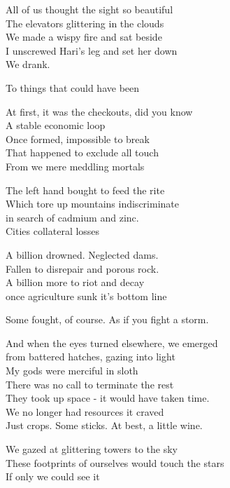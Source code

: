 All of us thought the sight so beautiful\\
The elevators glittering in the clouds\\
We made a wispy fire and sat beside\\
I unscrewed Hari’s leg and set her down\\
We drank.

To things that could have been

At first, it was the checkouts, did you know\\
A stable economic loop\\
Once formed, impossible to break\\
That happened to exclude all touch\\
From we mere meddling mortals

The left hand bought to feed the rite\\
Which tore up mountains indiscriminate  \\
in search of cadmium and zinc.\\
Cities collateral losses

A billion drowned. Neglected dams.\\
Fallen to disrepair and porous rock.\\
A billion more to riot and decay\\
once agriculture sunk it’s bottom line

Some fought, of course. As if you fight a storm.

And when the eyes turned elsewhere, we emerged\\
from battered hatches, gazing into light\\
My gods were merciful in sloth\\
There was no call to terminate the rest\\
They took up space - it would have taken time.\\
We no longer had resources it craved\\
Just crops. Some sticks. At best, a little wine.

We gazed at glittering towers to the sky\\
These footprints of ourselves would touch the stars\\
If only we could see it
